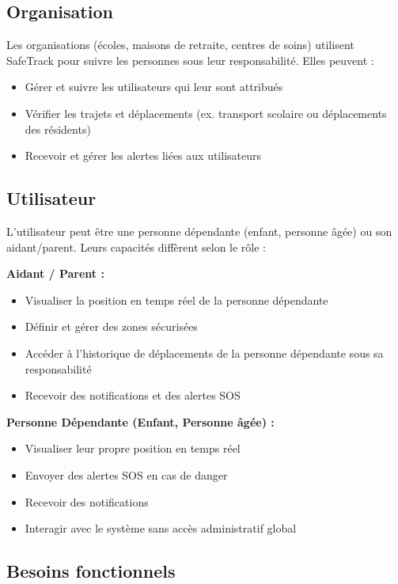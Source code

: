 \subsection*{Organisation}
Les organisations (écoles, maisons de retraite, centres de soins) utilisent SafeTrack pour suivre les personnes sous leur responsabilité. Elles peuvent :
\begin{itemize}
    \item Gérer et suivre les utilisateurs qui leur sont attribués
    \item Vérifier les trajets et déplacements (ex. transport scolaire ou déplacements des résidents)
    \item Recevoir et gérer les alertes liées aux utilisateurs
\end{itemize}
\newpage

\subsection*{Utilisateur}
L'utilisateur peut être une personne dépendante (enfant, personne âgée) ou son aidant/parent. Leurs capacités diffèrent selon le rôle :

\textbf{Aidant / Parent :}
\begin{itemize}
    \item Visualiser la position en temps réel de la personne dépendante
    \item Définir et gérer des zones sécurisées
    \item Accéder à l'historique de déplacements de la personne dépendante sous sa responsabilité
    \item Recevoir des notifications et des alertes SOS
\end{itemize}

\textbf{Personne Dépendante (Enfant, Personne âgée) :}
\begin{itemize}
    \item Visualiser leur propre position en temps réel
    \item Envoyer des alertes SOS en cas de danger
    \item Recevoir des notifications
    \item Interagir avec le système sans accès administratif global
\end{itemize}

\subsection{Besoins fonctionnels}

